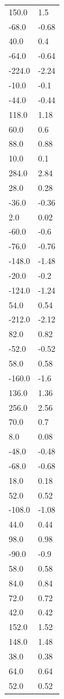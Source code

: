 \begin{longtable}{ll}
150.0 & 1.5 \\
-68.0 & -0.68 \\
40.0 & 0.4 \\
-64.0 & -0.64 \\
-224.0 & -2.24 \\
-10.0 & -0.1 \\
-44.0 & -0.44 \\
118.0 & 1.18 \\
60.0 & 0.6 \\
88.0 & 0.88 \\
10.0 & 0.1 \\
284.0 & 2.84 \\
28.0 & 0.28 \\
-36.0 & -0.36 \\
2.0 & 0.02 \\
-60.0 & -0.6 \\
-76.0 & -0.76 \\
-148.0 & -1.48 \\
-20.0 & -0.2 \\
-124.0 & -1.24 \\
54.0 & 0.54 \\
-212.0 & -2.12 \\
82.0 & 0.82 \\
-52.0 & -0.52 \\
58.0 & 0.58 \\
-160.0 & -1.6 \\
136.0 & 1.36 \\
256.0 & 2.56 \\
70.0 & 0.7 \\
8.0 & 0.08 \\
-48.0 & -0.48 \\
-68.0 & -0.68 \\
18.0 & 0.18 \\
52.0 & 0.52 \\
-108.0 & -1.08 \\
44.0 & 0.44 \\
98.0 & 0.98 \\
-90.0 & -0.9 \\
58.0 & 0.58 \\
84.0 & 0.84 \\
72.0 & 0.72 \\
42.0 & 0.42 \\
152.0 & 1.52 \\
148.0 & 1.48 \\
38.0 & 0.38 \\
64.0 & 0.64 \\
52.0 & 0.52 \\

\end{longtable}
